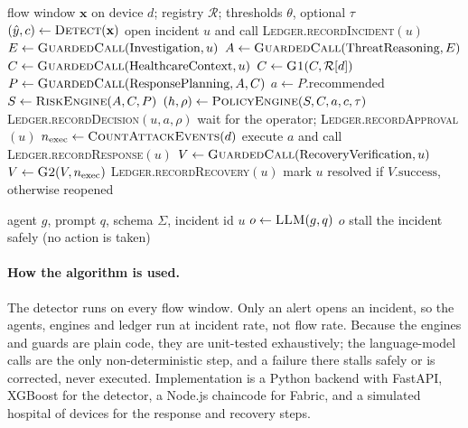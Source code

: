\documentclass[preprint,12pt]{elsarticle}
\newcommand{\pacr}{\textsc{Pacr}}
\begin{document}
\begin{algorithm}[htbp]
\caption{\pacr{} incident handling}
\label{alg:main}
\begin{algorithmic}[1]
\Require flow window $\mathbf{x}$ on device $d$; registry $\mathcal{R}$; thresholds $\theta$, optional $\tau$
\State $(\hat y, c)\gets \textsc{Detect}(\mathbf{x})$ 
  \State \Return
\EndIf
\State open incident $u$ and call \textsc{Ledger.recordIncident}$(u)$
\State $E\gets \textsc{GuardedCall}(\text{Investigation}, u)$
\State $A\gets \textsc{GuardedCall}(\text{ThreatReasoning}, E)$
\State $C\gets \textsc{GuardedCall}(\text{HealthcareContext}, u)$
\State $C\gets \textsc{G1}(C,\mathcal{R}[d])$ 
\State $P\gets \textsc{GuardedCall}(\text{ResponsePlanning}, A, C)$
\State $a\gets P.\text{recommended}$
\State $S\gets \textsc{RiskEngine}(A, C, P)$ 
\State $(h, \rho)\gets \textsc{PolicyEngine}(S, C, a, c, \tau)$ 
\State \textsc{Ledger.recordDecision}$(u, a, \rho)$
  \State wait for the operator; \textsc{Ledger.recordApproval}$(u)$
   \State \Return \EndIf
\EndIf
\State $n_{\mathrm{exec}}\gets \textsc{CountAttackEvents}(d)$
\State execute $a$ and call \textsc{Ledger.recordResponse}$(u)$
\State $V\gets \textsc{GuardedCall}(\text{RecoveryVerification}, u)$
\State $V\gets \textsc{G2}(V, n_{\mathrm{exec}})$ 
\State \textsc{Ledger.recordRecovery}$(u)$
\State mark $u$ resolved if $V.\text{success}$, otherwise reopened
\end{algorithmic}
\end{algorithm}

\begin{algorithm}[htbp]
\caption{\textsc{GuardedCall}: schema validation, retry and identity check}
\label{alg:guard}
\begin{algorithmic}[1]
\Require agent $g$, prompt $q$, schema $\Sigma$, incident id $u$
  \State $o\gets \textsc{LLM}(g,q)$
   
    \State \Return $o$
  \EndIf
\EndFor
\State stall the incident safely (no action is taken)
\end{algorithmic}
\end{algorithm}

\paragraph{How the algorithm is used.}
The detector runs on every flow window. Only an alert opens an incident, so the agents, engines and ledger run at incident rate, not flow rate. Because the engines and guards are plain code, they are unit-tested exhaustively; the language-model calls are the only non-deterministic step, and a failure there stalls safely or is corrected, never executed. Implementation is a Python backend with FastAPI, XGBoost for the detector, a Node.js chaincode for Fabric, and a simulated hospital of devices for the response and recovery steps.
\end{document}

